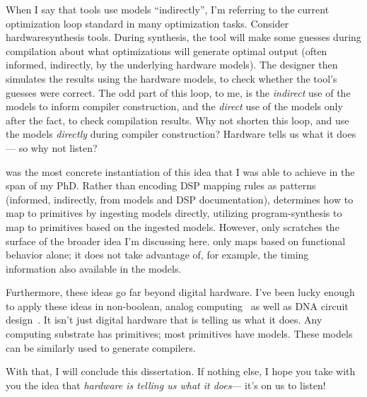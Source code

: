 When I say that tools use models ``indirectly'', 
  I'm referring to the current optimization loop
  standard in many optimization tasks.
Consider \gls{hardwaresynthesis} tools.
During synthesis, the tool will
  make some guesses during compilation
  about what optimizations will generate optimal output
  (often informed, indirectly, by the underlying hardware models).
The designer then
  simulates the results using the hardware models,
  to check whether the tool's guesses were correct.
The odd part of this loop, to me,
  is the \textit{indirect} use of the models
  to inform compiler construction,
  and the \textit{direct} use of the models
  only after the fact, to check compilation results.
Why not shorten this loop, and use the models \textit{directly}
   during compiler construction?
Hardware tells us what it does---%
  so why not listen?

\lr was the most concrete
  instantiation of this idea
  that I was able to achieve
  in the span of my PhD.
Rather than encoding DSP mapping rules
  as patterns (informed, indirectly, from models
    and DSP documentation),
  \lr determines how to map to primitives
  by ingesting models directly,
  utilizing \gls{program-synthesis}
  to map to primitives based on the ingested models.
However, \lr only scratches the surface
  of the broader idea 
  I'm discussing here.
\lr only maps based on functional behavior alone;
  it does not take advantage of, for example,
  the timing information
  also available in the models.

Furthermore,
  these ideas go far beyond digital hardware.
I've been lucky enough to apply these ideas
  in non-boolean, analog computing~\cite{yoon2018fefet,yoon2019ferrofet,raychowdhury2018computing}
  as well as DNA circuit design~\cite{wathieu2023fridge}.
It isn't just digital hardware
  that is telling us what it does.
Any computing substrate has \glspl{primitive};
  most primitives have models.
These models can be similarly used to generate compilers.


\vspace{10mm}

\noindent
With that, I will conclude this dissertation.
If nothing else, I hope you take with you
  the idea that
  \textit{hardware is telling us what it does}---%
  it's on us to listen!